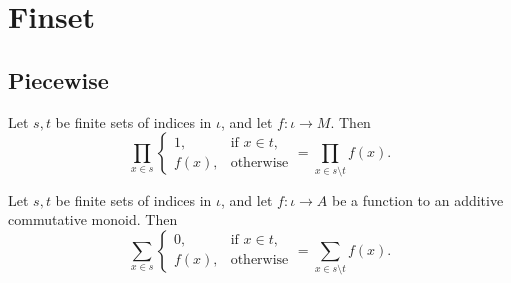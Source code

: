 \chapter{Finset} 

\section{Piecewise}

\begin{lemma}
    \label{lem:prod_ite_not_mem}
    \leanok
    Let $s, t$ be finite sets of indices in $\iota$, and let $f \colon \iota \to M$. 
    Then
    \[
    \prod_{x \in s} 
    \begin{cases}
    1, & \text{if } x \in t, \\
    f(x), & \text{otherwise}
    \end{cases}
    =
    \prod_{x \in s \setminus t} f(x).
    \]
\end{lemma}

\begin{lemma}\label{lem:sum_ite_not_mem}
    \leanok
    Let $s, t$ be finite sets of indices in $\iota$, and let $f \colon \iota \to A$ be a function to an additive commutative monoid. Then
    \[
    \sum_{x \in s} 
    \begin{cases}
    0, & \text{if } x \in t, \\
    f(x), & \text{otherwise}
    \end{cases}
    =
    \sum_{x \in s \setminus t} f(x).
    \]
\end{lemma}